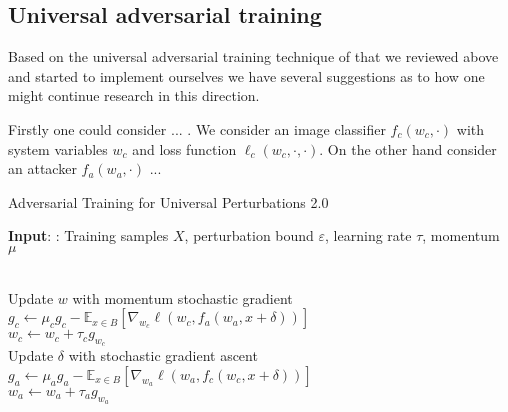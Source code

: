\subsection{Universal adversarial training}

Based on the universal adversarial training technique of \cite{shafahi_universal_2018} that we reviewed above and started to implement ourselves we have several suggestions as to how one might continue research in this direction. 

Firstly one could consider ... . We consider an image classifier $f_c(w_c,\cdot)$ with system variables $w_c$ and loss function $\ell_c(w_c, \cdot, \cdot)$. On the other hand consider an attacker $f_a(w_a,\cdot)$ ... 

\begin{algorithm}
\caption{Adversarial Training for Universal Perturbations 2.0}\label{Alg_4}

 \textbf{Input}: : Training samples $X$, perturbation bound $\varepsilon$, learning rate $\tau$, momentum $\mu$ \\
\begin{algorithmic}[1]




 \\
\hspace{\algorithmicindent} Update $w$ with momentum stochastic gradient \\
\hspace{\algorithmicindent} \hspace{\algorithmicindent} $g_c \gets \mu_c g_c - \mathbb{E}_{x \in B} [\nabla_{w_c} \ell(w_c,f_a(w_a,x+\delta))]$ \\
\hspace{\algorithmicindent} \hspace{\algorithmicindent} $w_c \gets w_c + \tau_c g_{w_c}$ \\
\hspace{\algorithmicindent} Update $\delta$ with stochastic gradient ascent \\
\hspace{\algorithmicindent} \hspace{\algorithmicindent}  $g_a \gets \mu_a g_a - \mathbb{E}_{x \in B} [\nabla_{w_a} \ell(w_a,f_c(w_c,x+\delta))]$ \\
\hspace{\algorithmicindent} \hspace{\algorithmicindent} $w_a \gets w_a + \tau_a g_{w_a}$
\EndFor
\EndFor
\end{algorithmic}
\end{algorithm}

